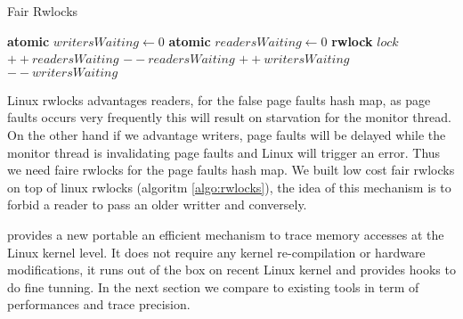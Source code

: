 \begin{algorithm}[!htb]
    \caption{Fair Rwlocks}
    \label{algo:rwlocks}
    \begin{algorithmic}[1]
    \State \textbf{atomic} {$writersWaiting \gets 0$}
    \State \textbf{atomic} $readersWaiting \gets 0$
    \State \textbf{rwlock} $lock$
        \State $++readersWaiting$
            \State {}
        \EndWhile
        \State {}
        \State $--readersWaiting$
    \EndFunction
        \State {}
    \EndFunction
            \State {}
        \EndWhile
        \State $++writersWaiting$
        \State {}
        \State $--writersWaiting$
    \EndFunction
        \State {}
    \EndFunction
    \end{algorithmic}
\end{algorithm}

Linux rwlocks advantages readers, for the false page faults hash map, as page
faults occurs very frequently this will result on starvation for the monitor
thread. On the other hand if we advantage writers, page faults will be delayed
while the monitor thread is invalidating page faults and Linux will trigger an
error. Thus we need faire rwlocks for the page faults hash map. We built
low cost fair rwlocks on top of linux rwlocks (algoritm \ref{algo:rwlocks}),
the idea of this mechanism is to forbid a reader to pass an older writter and
conversely.

\Moca provides a new portable an efficient mechanism to trace memory accesses
at the Linux kernel level. It does not require any kernel re-compilation or
hardware modifications, it runs out of the box on recent Linux kernel and
provides hooks to do fine tunning. In the next section we compare \Moca to
existing tools in term of performances and trace precision.
